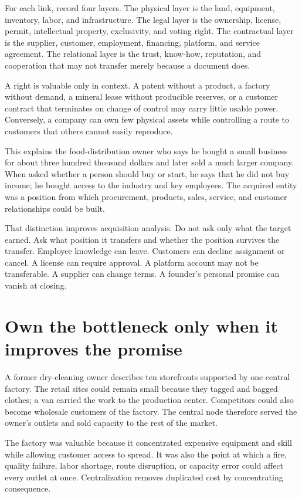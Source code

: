 For each link, record four layers. The physical layer is the land, equipment,
inventory, labor, and infrastructure. The legal layer is the ownership,
license, permit, intellectual property, exclusivity, and voting right. The
contractual layer is the supplier, customer, employment, financing, platform,
and service agreement. The relational layer is the trust, know-how, reputation,
and cooperation that may not transfer merely because a document does.

A right is valuable only in context. A patent without a product, a factory
without demand, a mineral lease without producible reserves, or a customer
contract that terminates on change of control may carry little usable power.
Conversely, a company can own few physical assets while controlling a route to
customers that others cannot easily reproduce.

This explains the food-distribution owner who says he bought a small business
for about three hundred thousand dollars and later sold a much larger company.
When asked whether a person should buy or start, he says that he did not buy
income; he bought access to the industry and key employees. The acquired entity
was a position from which procurement, products, sales, service, and customer
relationships could be built.

That distinction improves acquisition analysis. Do not ask only what the
target earned. Ask what position it transfers and whether the position survives
the transfer. Employee knowledge can leave. Customers can decline assignment
or cancel. A license can require approval. A platform account may not be
transferable. A supplier can change terms. A founder's personal promise can
vanish at closing.

\section{Own the bottleneck only when it improves the promise}

A former dry-cleaning owner describes ten storefronts supported by one central
factory. The retail sites could remain small because they tagged and bagged
clothes; a van carried the work to the production center. Competitors could
also become wholesale customers of the factory. The central node therefore
served the owner's outlets and sold capacity to the rest of the market.

The factory was valuable because it concentrated expensive equipment and
skill while allowing customer access to spread. It was also the point at which
a fire, quality failure, labor shortage, route disruption, or capacity error
could affect every outlet at once. Centralization removes duplicated cost by
concentrating consequence.

